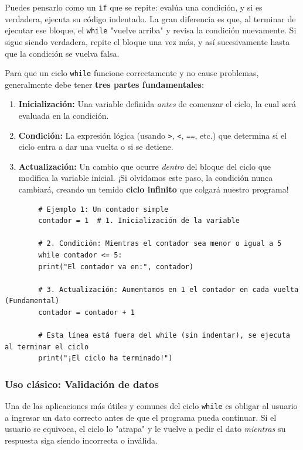\documentclass[11pt, a4paper]{article}
\begin{document}
	Puedes pensarlo como un \texttt{if} que se repite: evalúa una condición, y si es verdadera, ejecuta su código indentado. La gran diferencia es que, al terminar de ejecutar ese bloque, el \texttt{while} "vuelve arriba" y revisa la condición nuevamente. Si sigue siendo verdadera, repite el bloque una vez más, y así sucesivamente hasta que la condición se vuelva falsa.
	
	Para que un ciclo \texttt{while} funcione correctamente y no cause problemas, generalmente debe tener \textbf{tres partes fundamentales}:
	\begin{enumerate}
		\item \textbf{Inicialización:} Una variable definida \textit{antes} de comenzar el ciclo, la cual será evaluada en la condición.
		\item \textbf{Condición:} La expresión lógica (usando \texttt{>}, \texttt{<}, \texttt{==}, etc.) que determina si el ciclo entra a dar una vuelta o si se detiene.
		\item \textbf{Actualización:} Un cambio que ocurre \textit{dentro} del bloque del ciclo que modifica la variable inicial. ¡Si olvidamos este paso, la condición nunca cambiará, creando un temido \textbf{ciclo infinito} que colgará nuestro programa!
	\end{enumerate}
	
	\begin{lstlisting}
		# Ejemplo 1: Un contador simple
		contador = 1  # 1. Inicialización de la variable
		
		# 2. Condición: Mientras el contador sea menor o igual a 5
		while contador <= 5:  
		print("El contador va en:", contador)
		
		# 3. Actualización: Aumentamos en 1 el contador en cada vuelta (Fundamental)
		contador = contador + 1  
		
		# Esta línea está fuera del while (sin indentar), se ejecuta al terminar el ciclo
		print("¡El ciclo ha terminado!")
	\end{lstlisting}
	
	\subsubsection*{Uso clásico: Validación de datos}
	Una de las aplicaciones más útiles y comunes del ciclo \texttt{while} es obligar al usuario a ingresar un dato correcto antes de que el programa pueda continuar. Si el usuario se equivoca, el ciclo lo "atrapa" y le vuelve a pedir el dato \textit{mientras} su respuesta siga siendo incorrecta o inválida.
	
\end{document}
